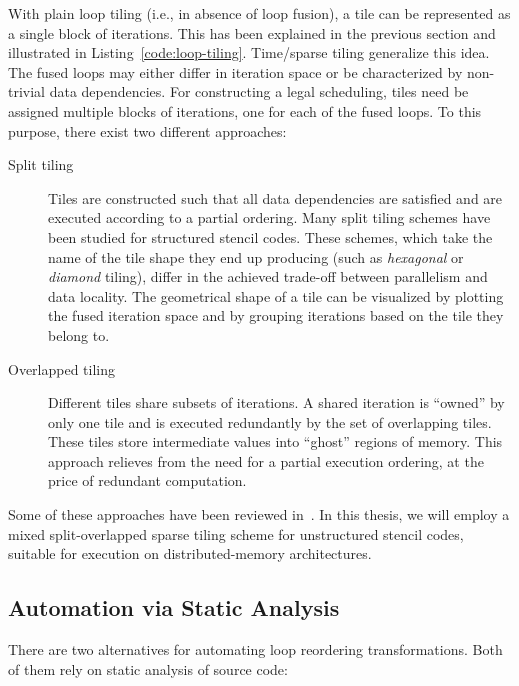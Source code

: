 With plain loop tiling (i.e., in absence of loop fusion), a tile can be represented as a single block of iterations. This has been explained in the previous section and illustrated in Listing~\ref{code:loop-tiling}. Time/sparse tiling generalize this idea. The fused loops may either differ in iteration space or be characterized by non-trivial data dependencies. For constructing a legal scheduling, tiles need be assigned multiple blocks of iterations, one for each of the fused loops. To this purpose, there exist two different approaches:
\begin{description}
\item[Split tiling] Tiles are constructed such that all data dependencies are satisfied and are executed according to a partial ordering. Many split tiling schemes have been studied for structured stencil codes. These schemes, which take the name of the tile shape they end up producing (such as {\em hexagonal} or {\em diamond} tiling), differ in the achieved trade-off between parallelism and data locality. The geometrical shape of a tile can be visualized by plotting the fused iteration space and by grouping iterations based on the tile they belong to.
\item[Overlapped tiling] Different tiles share subsets of iterations. A shared iteration is ``owned'' by only one tile and is executed redundantly by the set of overlapping tiles. These tiles store intermediate values into ``ghost'' regions of memory. This approach relieves from the need for a partial execution ordering, at the price of redundant computation.
\end{description}
Some of these approaches have been reviewed in~\cite{survey-tile-shape}. In this thesis, we will employ a mixed split-overlapped sparse tiling scheme for unstructured stencil codes, suitable for execution on distributed-memory architectures.


\subsection{Automation via Static Analysis}
\label{sec:bkg:poly}
There are two alternatives for automating loop reordering transformations. Both of them rely on static analysis of source code:

